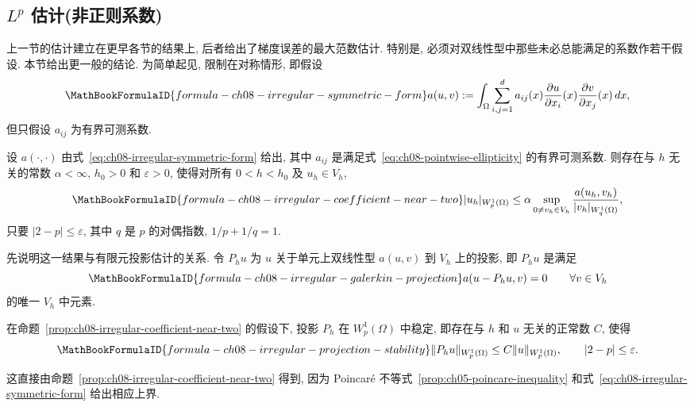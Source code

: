 \subsection{$L^p$ 估计(非正则系数)}
\label{sec:ch08-lp-estimates-irregular-coefficients}
\setcounter{thmcount}{0}
\setcounter{equation}{0}

上一节的估计建立在更早各节的结果上, 后者给出了梯度误差的最大范数估计. 特别是, 必须对双线性型中那些未必总能满足的系数作若干假设. 本节给出更一般的结论. 为简单起见, 限制在对称情形, 即假设
\begin{equation}
\MathBookFormulaID{formula-ch08-irregular-symmetric-form}
\label{eq:ch08-irregular-symmetric-form}
a(u,v):=\int_\Omega\sum_{i,j=1}^{d}a_{ij}(x)
\frac{\partial u}{\partial x_i}(x)\frac{\partial v}{\partial x_j}(x)\,dx,
\end{equation}
但只假设 $a_{ij}$ 为有界可测系数.

\begin{Proposition}
\label{prop:ch08-irregular-coefficient-near-two}
设 $a(\cdot,\cdot)$ 由式~\eqref{eq:ch08-irregular-symmetric-form} 给出, 其中 $a_{ij}$ 是满足式~\eqref{eq:ch08-pointwise-ellipticity} 的有界可测系数. 则存在与 $h$ 无关的常数 $\alpha<\infty$, $h_0>0$ 和 $\varepsilon>0$, 使得对所有 $0<h<h_0$ 及 $u_h\in V_h$,
\[
\MathBookFormulaID{formula-ch08-irregular-coefficient-near-two}
|u_h|_{W_p^1(\Omega)}\leq\alpha\sup_{0\neq v_h\in V_h}
\frac{a(u_h,v_h)}{|v_h|_{W_q^1(\Omega)}},
\]
只要 $|2-p|\leq\varepsilon$, 其中 $q$ 是 $p$ 的对偶指数, $1/p+1/q=1$.
\end{Proposition}

先说明这一结果与有限元投影估计的关系. 令 $P_hu$ 为 $u$ 关于单元上双线性型 $a(u,v)$ 到 $V_h$ 上的投影, 即 $P_hu$ 是满足
\[
\MathBookFormulaID{formula-ch08-irregular-galerkin-projection}
a(u-P_hu,v)=0
\qquad\forall v\in V_h
\]
的唯一 $V_h$ 中元素.

\begin{Corollary}
\label{cor:ch08-irregular-projection-stability}
在命题~\ref{prop:ch08-irregular-coefficient-near-two} 的假设下, 投影 $P_h$ 在 $W_p^1(\Omega)$ 中稳定, 即存在与 $h$ 和 $u$ 无关的正常数 $C$, 使得
\[
\MathBookFormulaID{formula-ch08-irregular-projection-stability}
\|P_hu\|_{W_p^1(\Omega)}\leq C\|u\|_{W_p^1(\Omega)},
\qquad |2-p|\leq\varepsilon.
\]
\end{Corollary}

这直接由命题~\ref{prop:ch08-irregular-coefficient-near-two} 得到, 因为 Poincaré 不等式~\ref{prop:ch05-poincare-inequality} 和式~\eqref{eq:ch08-irregular-symmetric-form} 给出相应上界.

